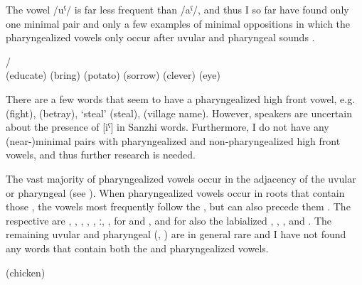 The vowel /uˁ/ is far less frequent than /aˁ/, and thus I so far have found only one minimal pair and only a few examples of minimal oppositions in which the pharyngealized vowels only occur after uvular and pharyngeal sounds .
%
\begin{exe}
	\ex	\label{ex:pharyngealization minimal pairs B phon@A}
	\begin{xlist}
	\TabPositions{15em}
		\ex	{} /   \tab {} \\
		(educate) \tab (bring)
		\ex	{}  (potato) \tab {}  (sorrow)
		\ex	{} 		\tab {}  (clever)
		\ex	{} 		\tab {}  (eye)
	\end{xlist}
\end{exe}

There are a few words that seem to have a pharyngealized high front vowel, e.g.   (fight),   (betray),  `steal' (steal),  (village name). However, speakers are uncertain about the presence of [iˁ] in Sanzhi words. Furthermore, I do not have any (near-)minimal pairs with pharyngealized and non-pharyngealized high front vowels, and thus further research is needed.

The vast majority of pharyngealized vowels occur in the adjacency of the uvular or pharyngeal  (see ). When pharyngealized vowels occur in roots that contain those , the vowels most frequently follow the , but can also precede them . The respective  are , , , , , ː, ,  for  and , and for  also the labialized  , , , and . The remaining uvular and pharyngeal  (, ) are in general rare and I have not found any words that contain both the  and pharyngealized vowels.
%
\begin{exe}
	\ex	\label{ex:uvular pharyngealphon1}
\TabPositions{15em}
  (chicken)	\tab {} 	\\
 	\tab {} 	\\
 	\tab {} 	\\
 	
\end{exe}

